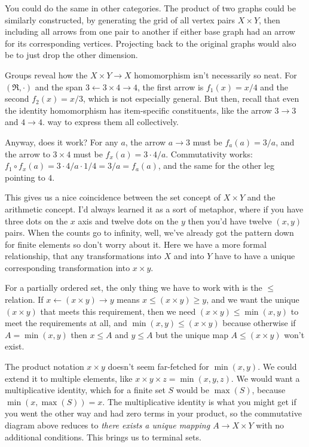 \documentclass[11pt]{article}
\begin{document}
You could do the same in other categories. The product of two graphs could be similarly
constructed, by generating the grid of all vertex pairs $X\times Y$, then including all
arrows from one pair to another if either base graph had an arrow for its corresponding
vertices. Projecting back to the original graphs would also be to just drop the other
dimension.

Groups reveal how the $X\times Y \to X$ homomorphism isn't
necessarily so neat. For $(\Re, \cdot)$ and the span $3 \leftarrow 3\times 4 \rightarrow 4$, the
first arrow is $f_1(x)=x/4$ and the second $f_2(x)=x/3$, which is not especially general.
But then, recall that even the identity homomorphism has item-specific constituents, like the arrow $3\to 3$ and $4\to
4$.
way to express them all collectively.

Anyway, does it work? For any $a$, the arrow $a\to 3$ must be $f_a(a)=3/a$, and the arrow to
$3\times 4$ must be $f_{x}(a)=3\cdot 4/a$. Commutativity works: $f_1\circ f_x(a) = 3\cdot
4/a\cdot 1/4 = 3/a = f_a(a)$, and the same for the other leg pointing to $4$.

This gives us a nice coincidence between the set concept of $X\times Y$ and the arithmetic
concept. I'd always learned it as a sort of metaphor, where if you have three dots on the
$x$ axis and twelve dots on the $y$ then you'd have twelve $(x,y)$ pairs. When the counts
go to infinity, well, we've already got the pattern down for finite elements so don't
worry about it. Here we have a more formal relationship, that any transformations into $X$
and into $Y$ have to have a unique corresponding transformation into $x\times y$.



For a partially ordered set, the only thing we have to work with is the $\leq$ relation.
If $x\leftarrow (x\times y) \rightarrow y$ means $x\leq (x\times y) \geq y$, and we want
the unique $(x\times y)$ that meets this requirement, then we need
$(x\times y)\leq \min(x,y)$ to meet the requirements at all, and 
$\min(x,y)\leq (x\times y)$ because otherwise if $A = \min(x,y)$ then $x\leq A$ and $y\leq
A$ but the unique map $A\leq (x\times y)$ won't exist.

The product notation $x\times y$ doesn't seem far-fetched for $\min(x,y)$. We could extend
it to multiple elements, like $x\times y\times z = \min(x,y,z)$. We would want a
multiplicative identity, which for a finite set $S$ would be $\max(S)$, because
$\min(x,\max(S)) = x$. The multiplicative identity is what you might get if you
went the other way and had zero terms in your product, so the commutative diagram above
reduces to {\em there exists a unique mapping $A\to X\times Y$} with no additional
conditions. This brings us to terminal sets.
\end{document}
